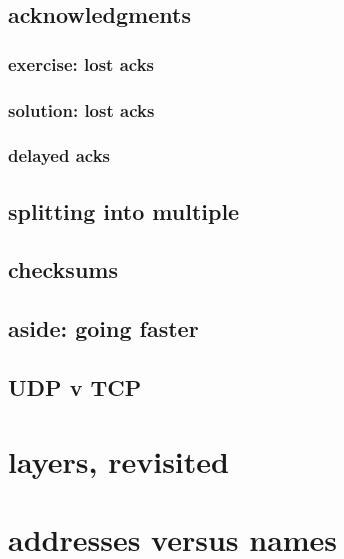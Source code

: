 \subsection{acknowledgments}

\subsubsection{exercise: lost acks}

\subsubsection{solution: lost acks}
\iftoggle{heldback}{}{}
\subsubsection{delayed acks}



\subsection{splitting into multiple}



\subsection{checksums}


\subsection{aside: going faster}


\subsection{UDP v TCP}


\section{layers, revisited}
% 


\section{addresses versus names}




